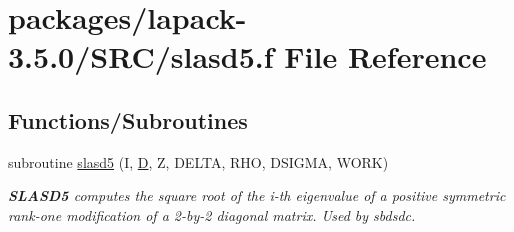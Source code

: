 \hypertarget{slasd5_8f}{}\section{packages/lapack-\/3.5.0/\+S\+R\+C/slasd5.f File Reference}
\label{slasd5_8f}
\subsection*{Functions/\+Subroutines}
\begin{DoxyCompactItemize}
\item 
subroutine \hyperlink{group__auxOTHERauxiliary_ga19de62ad22e8492c93ac450198557d05}{slasd5} (I, \hyperlink{odrpack_8h_a7dae6ea403d00f3687f24a874e67d139}{D}, Z, D\+E\+L\+T\+A, R\+H\+O, D\+S\+I\+G\+M\+A, W\+O\+R\+K)
\begin{DoxyCompactList}\small\item\em {\bfseries S\+L\+A\+S\+D5} computes the square root of the i-\/th eigenvalue of a positive symmetric rank-\/one modification of a 2-\/by-\/2 diagonal matrix. Used by sbdsdc. \end{DoxyCompactList}\end{DoxyCompactItemize}
